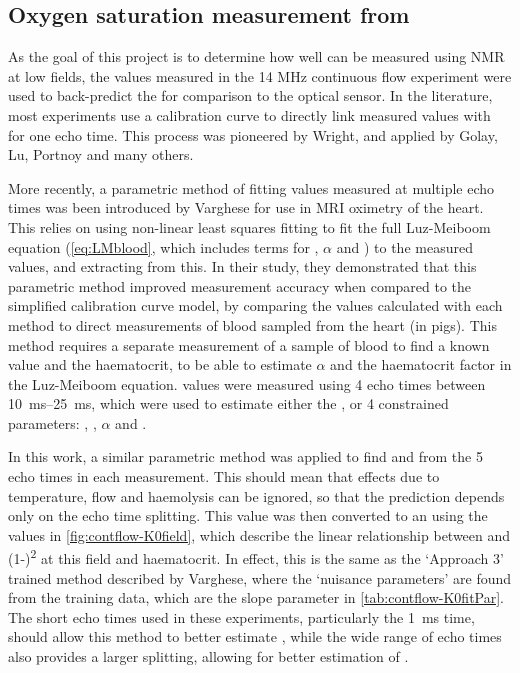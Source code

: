 \subsection{Oxygen saturation measurement from \Ttwo}
As the goal of this project is to determine how well \SOtwo can be measured using NMR at low fields, the \Ttwo values measured in the 14 MHz continuous flow experiment were used to back-predict the \SOtwo for comparison to the optical sensor.
In the literature, most experiments use a calibration curve to directly link measured \Ttwo values with \SOtwo for one echo time.
This process was pioneered by Wright\cite{WrightEstimatingoxygensaturation1991}, and applied by Golay\cite{GolayMeasurementtissueoxygen2001}, Lu\cite{LuQuantitativeevaluationoxygenation2008}, Portnoy\cite{PortnoyNoninvasiveevaluationblood2017} and many others.

More recently, a parametric method of fitting \Ttwo values measured at multiple echo times was been introduced by Varghese\cite{VargheseCMRbasedbloodoximetry2017} for use in MRI oximetry of the heart.
This relies on using non-linear least squares fitting to fit the full Luz-Meiboom equation (\autoref{eq:LMblood}, which includes terms for \Hct, $\alpha$ and \SOtwo) to the measured \Ttwo values, and extracting \SOtwo from this.
In their study, they demonstrated that this parametric method improved \SOtwo measurement accuracy when compared to the simplified calibration curve model, by comparing the \SOtwo values calculated with each method to direct \SOtwo measurements of blood sampled from the heart (in pigs).
This method requires a separate measurement of a sample of blood to find a known \SOtwo value and the haematocrit, to be able to estimate $\alpha$ and the haematocrit factor in the Luz-Meiboom equation.
\Ttwo values were measured using 4 echo times between \SIrange{10}{25}{ms}, which were used to estimate either the \SOtwo, or 4 constrained parameters: \SOtwo, \Hct, $\alpha$ and \TtwoO.

In this work, a similar parametric method was applied to find \Kzero and \TtwoO from the 5 echo times in each measurement.
This should mean that effects due to temperature, flow and haemolysis can be ignored, so that the \SOtwo prediction depends only on the echo time splitting.
This \Kzero value was then converted to an \SOtwo using the values in \autoref{fig:contflow-K0field}, which describe the linear relationship between \Kzero and (1-\SOtwo)\textsuperscript{2} at this field and haematocrit.
In effect, this is the same as the `Approach 3' trained method described by Varghese, where the `nuisance parameters' are found from the training data, which are the slope parameter in \autoref{tab:contflow-K0fitPar}.
The short echo times used in these experiments, particularly the \SI{1}{ms} time, should allow this method to better estimate \TtwoO, while the wide range of echo times also provides a larger splitting, allowing for better estimation of \Kzero.

